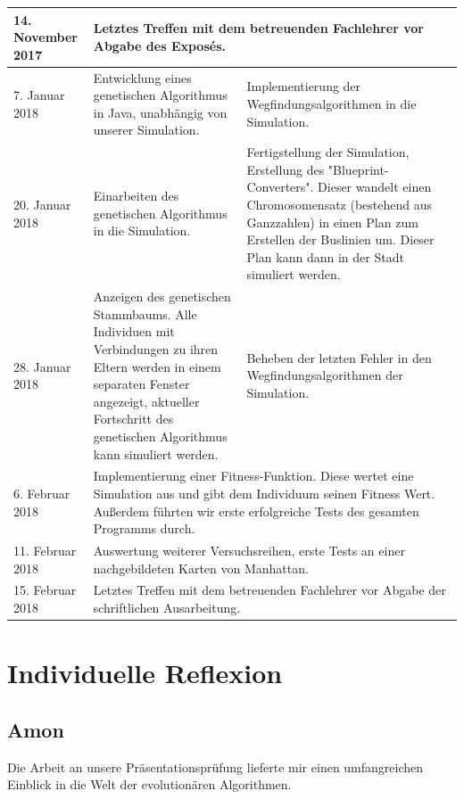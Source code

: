 \documentclass[a4paper, 11pt]{scrartcl}
\begin{document}
\begin{longtable}{p{\tabledate}|p{\tablerow}|p{\tablerow}}
14. November 2017 & \multicolumn{2}{p{\tablecontent}}{Letztes Treffen mit dem betreuenden Fachlehrer vor Abgabe des Exposés.}\\
\hline

7. Januar 2018 & Entwicklung eines genetischen Algorithmus in Java, unabhängig von unserer Simulation. & Implementierung der Wegfindungsalgorithmen in die Simulation.\\
\hline

20. Januar 2018 & Einarbeiten des genetischen Algorithmus in die Simulation. & Fertigstellung der Simulation, Erstellung des "Blueprint-Converters". Dieser wandelt einen Chromosomensatz (bestehend aus Ganzzahlen) in einen Plan zum Erstellen der Buslinien um. Dieser Plan kann dann in der Stadt simuliert werden.\\
\hline

28. Januar 2018 & Anzeigen des genetischen Stammbaums. Alle Individuen mit Verbindungen zu ihren Eltern werden in einem separaten Fenster angezeigt, aktueller Fortschritt des genetischen Algorithmus kann simuliert werden. & Beheben der letzten Fehler in den Wegfindungsalgorithmen der Simulation.\\
\hline

6. Februar 2018 & \multicolumn{2}{p{\tablecontent}}{Implementierung einer Fitness-Funktion. Diese wertet eine Simulation aus und gibt dem Individuum seinen Fitness Wert. Außerdem führten wir erste erfolgreiche Tests des gesamten Programms durch.} \\
\hline

11. Februar 2018 & \multicolumn{2}{p{\tablecontent}}{Auswertung weiterer Versuchsreihen, erste Tests an einer nachgebildeten Karten von Manhattan.} \\
\hline

15. Februar 2018 & \multicolumn{2}{p{\tablecontent}}{Letztes Treffen mit dem betreuenden Fachlehrer vor Abgabe der schriftlichen Ausarbeitung.} \\
\hline

\end{longtable}



\newpage
\section{Individuelle Reflexion}
\subsection{Amon}
Die Arbeit an unsere Präsentationsprüfung lieferte mir einen umfangreichen Einblick in die Welt der evolutionären Algorithmen.\\
\end{document}
